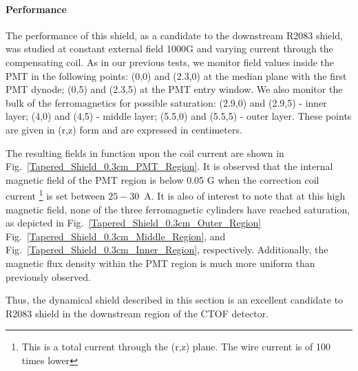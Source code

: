 \documentclass[12pt]{article}
\begin{document}
\paragraph{Performance}
The performance of this  shield, as a candidate to the downstream R2083 shield, 
was studied at constant external field 1000G and varying current through the 
compensating coil. 
As in our previous tests,  we  monitor field values inside the PMT in the following  points:
 (0,0) and (2.3,0) at  the median plane with the  first PMT dynode;
           (0,5) and (2.3,5) at  the PMT entry window.
We also monitor the bulk of the ferromagnetics for possible saturation:
(2.9,0) and (2.9,5) - inner layer; 
  (4,0) and (4,5) - middle layer; 
(5.5,0) and (5.5,5)  - outer layer.
These points are given in (r,z) form and are expressed in centimeters.


The resulting fields in function upon the coil current 
are shown in  Fig.~\ref{Tapered_Shield_0.3cm_PMT_Region}.
It is observed that the internal magnetic field of the PMT region is below 0.05 G 
when the correction coil current
\footnote{This is a total current through the (r,z) plane. The wire current is of 100 times lower}
is set between 
$25-30$~A.
It is also of interest to note that at this high magnetic field,
none of the three ferromagnetic cylinders have reached saturation, as depicted in 
Fig.~\ref{Tapered_Shield_0.3cm_Outer_Region} 
Fig.~\ref{Tapered_Shield_0.3cm_Middle_Region},
and Fig.~\ref{Tapered_Shield_0.3cm_Inner_Region}, 
respectively.
 Additionally, the magnetic flux density within the PMT region is much more uniform
than previously observed.

Thus, the dynamical shield described in this section is an  excellent candidate 
to R2083 shield in the downstream region of the CTOF detector.



\end{document}
